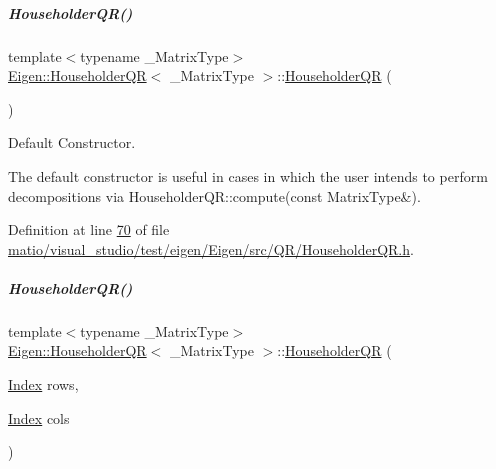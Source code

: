 \mbox{\label{group___q_r___module_a974adb10a0e066057aeb3b360df68380}} 
\subparagraph{\texorpdfstring{Householder\+Q\+R()}{HouseholderQR()}\hspace{0.1cm}{\footnotesize\ttfamily [5/8]}}
{\footnotesize\ttfamily template$<$typename \+\_\+\+Matrix\+Type$>$ \\
\hyperlink{group___q_r___module_class_eigen_1_1_householder_q_r}{Eigen\+::\+Householder\+QR}$<$ \+\_\+\+Matrix\+Type $>$\+::\hyperlink{group___q_r___module_class_eigen_1_1_householder_q_r}{Householder\+QR} (\begin{DoxyParamCaption}{ }\end{DoxyParamCaption})\hspace{0.3cm}{\ttfamily [inline]}}



Default Constructor. 

The default constructor is useful in cases in which the user intends to perform decompositions via Householder\+Q\+R\+::compute(const Matrix\+Type\&). 

Definition at line \hyperlink{matio_2visual__studio_2test_2eigen_2_eigen_2src_2_q_r_2_householder_q_r_8h_source_l00070}{70} of file \hyperlink{matio_2visual__studio_2test_2eigen_2_eigen_2src_2_q_r_2_householder_q_r_8h_source}{matio/visual\+\_\+studio/test/eigen/\+Eigen/src/\+Q\+R/\+Householder\+Q\+R.\+h}.

\mbox{\label{group___q_r___module_a1087457610c53e1574de521a51de0cd3}} 
\subparagraph{\texorpdfstring{Householder\+Q\+R()}{HouseholderQR()}\hspace{0.1cm}{\footnotesize\ttfamily [6/8]}}
{\footnotesize\ttfamily template$<$typename \+\_\+\+Matrix\+Type$>$ \\
\hyperlink{group___q_r___module_class_eigen_1_1_householder_q_r}{Eigen\+::\+Householder\+QR}$<$ \+\_\+\+Matrix\+Type $>$\+::\hyperlink{group___q_r___module_class_eigen_1_1_householder_q_r}{Householder\+QR} (\begin{DoxyParamCaption}\item[{\hyperlink{namespace_eigen_a62e77e0933482dafde8fe197d9a2cfde}{Index}}]{rows,  }\item[{\hyperlink{namespace_eigen_a62e77e0933482dafde8fe197d9a2cfde}{Index}}]{cols }\end{DoxyParamCaption})\hspace{0.3cm}{\ttfamily [inline]}}



